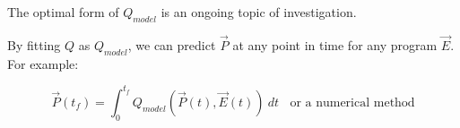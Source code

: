 \documentclass{../tex/report}
\begin{document}
\begin{spacing}{0.5}
The optimal form of $Q_{model}$ is an ongoing topic of investigation.

By fitting $Q$ as $Q_{model}$, we can predict $\vec P$ at any point in time for any program $\vec E$. For example:

$$\vec P(t_f)=\int_0^{t_f}Q_{model}(\vec P(t),\vec E(t))~dt~~~~\text{or a numerical method}$$

\end{spacing}

\newpage



\end{document}
